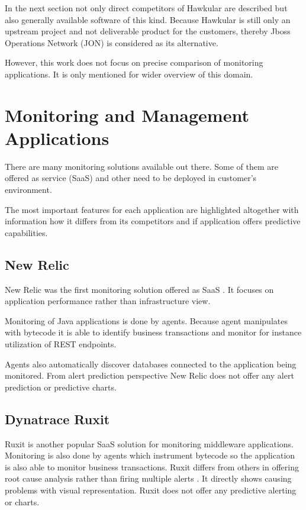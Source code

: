 In the next section not only direct competitors of Hawkular are described but also
generally available software of this kind. Because Hawkular is still only an upstream project and not deliverable
product for the customers, thereby Jboss Operations Network (JON) is considered as its alternative.

However, this work does not focus on precise comparison of monitoring applications. It is only mentioned for wider
overview of this domain.

    \section{Monitoring and Management Applications}
    There are many monitoring solutions available out there. Some of them are offered as service (SaaS) and other need
    to be deployed in customer's environment.

    The most important features for each application are highlighted altogether with information how it differs from its
    competitors and if application offers predictive capabilities.

        \subsection{New Relic}
        New Relic was the first monitoring solution offered as SaaS \cite{new-relic}. It focuses on application
        performance rather than infrastructure view.

        Monitoring of Java applications is done by agents. Because agent manipulates with bytecode it is able to
        identify business transactions and monitor for instance utilization of REST endpoints.

        Agents also automatically discover databases connected to the application being monitored. From alert
        prediction perspective New Relic does not offer any alert prediction or predictive charts.

        \subsection{Dynatrace Ruxit}
        Ruxit is another popular SaaS solution for monitoring middleware applications. Monitoring is also done by agents
        which instrument bytecode so the application is also able to monitor business transactions. Ruxit differs from
        others in offering root cause analysis rather than firing multiple alerts \cite{ruxit}. It directly shows
        causing problems with visual representation. Ruxit does not offer any predictive alerting or charts.

